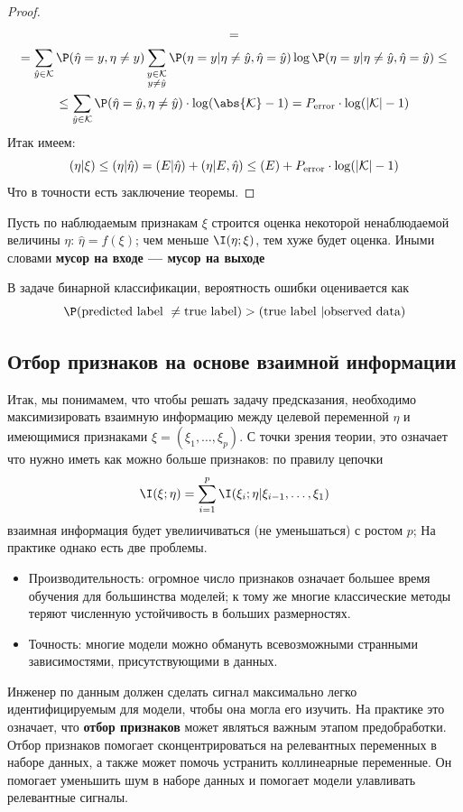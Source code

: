 \begin{proof}
\begin{multline*}
	=\\= \sum_{\hat{y} \in \mathcal{K}} \P(\hat{\eta} = y, \eta \neq y) \sum_{\substack{y \in \mathcal{K} \\ y \neq \hat{y}}} \P(\eta = y | \eta \neq \hat{y}, \hat{\eta} = \hat{y}) \log \P(\eta = y | \eta \neq \hat{y}, \hat{\eta} = \hat{y}) \leq\\\leq
		\sum_{\hat{y} \in \mathcal{K}} \P(\hat{\eta} = \hat{y}, \eta \neq \hat{y}) \cdot \log(\abs{\mathcal{K}} - 1) =  P_{\mathrm{error}} \cdot \log(|\mathcal{K}| - 1)
	\end{multline*}
	Итак имеем:
	\[
		\relax(\eta | \xi) \leq \relax(\eta | \hat{\eta}) = \relax(E | \hat{\eta}) + \relax(\eta | E, \hat{\eta}) \leq \relax(E) +  P_{\mathrm{error}} \cdot \log(|\mathcal{K}| - 1)
	\]
	Что в точности есть заключение теоремы.
\end{proof}

\begin{corollary}
	Пусть по наблюдаемым признакам $\xi$ строится оценка некоторой ненаблюдаемой величины $\eta$: $\hat{\eta} = f(\xi)$; чем меньше $\I(\eta; \xi)$, тем хуже будет оценка. Иными словами \textbf{мусор на входе --- мусор на выходе}
\end{corollary}
\begin{corollary}
	В задаче бинарной классификации, вероятность ошибки оценивается как
	\[
		\P(\text{\normalfont predicted label } \neq \text{\normalfont  true label}) > \H(\text{\normalfont true label } | \text{\normalfont  observed data}) 
	\]
\end{corollary}
\subsection{Отбор признаков на основе взаимной информации}
Итак, мы понимамем, что чтобы решать задачу предсказания, необходимо максимизировать взаимную информацию между целевой переменной $\eta$ и имеющимися признаками $\xi = (\xi_1, \ldots, \xi_p)$. С точки зрения теории, это означает что нужно иметь как можно больше признаков: по правилу цепочки
\[
	\I(\xi; \eta) = \sum_{i = 1}^{p}\I(\xi_i; \eta | \xi_{i - 1}, \ldots, \xi_1)
\]
взаимная информация будет увелиичиваться (не уменьшаться) с ростом $p$; На практике однако есть две проблемы.
\begin{itemize}[compact]
	\item Производительность: огромное число признаков означает большее время обучения для большинства моделей; к тому же многие классические методы теряют численную устойчивость в больших размерностях. 
	\item Точность: многие модели можно обмануть всевозможными странными зависимостями, присутствующими в данных.
\end{itemize}
Инженер по данным должен сделать сигнал максимально легко идентифицируемым для модели, чтобы она могла его изучить. На практике это означает, что \textbf{отбор признаков} может являться важным этапом предобработки. Отбор признаков помогает сконцентрироваться на релевантных переменных в наборе данных, а также может помочь устранить коллинеарные переменные. Он помогает уменьшить шум в наборе данных и помогает модели улавливать релевантные сигналы.

